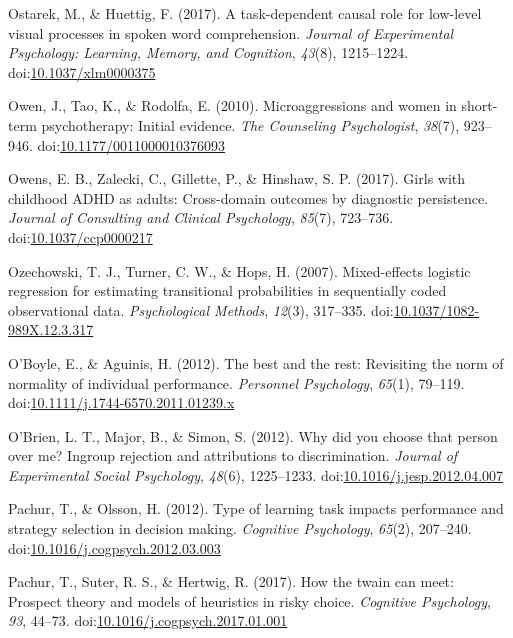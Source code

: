\documentclass[english,man]{apa6}
\theoremstyle{definition}
\theoremstyle{definition}
\theoremstyle{definition}
\theoremstyle{remark}
\begin{document}
\hypertarget{ref-Ostarek2017}{}
Ostarek, M., \& Huettig, F. (2017). A task-dependent causal role for
low-level visual processes in spoken word comprehension. \emph{Journal
of Experimental Psychology: Learning, Memory, and Cognition},
\emph{43}(8), 1215--1224.
doi:\href{https://doi.org/10.1037/xlm0000375}{10.1037/xlm0000375}

\hypertarget{ref-Owen2010}{}
Owen, J., Tao, K., \& Rodolfa, E. (2010). Microaggressions and women in
short-term psychotherapy: Initial evidence. \emph{The Counseling
Psychologist}, \emph{38}(7), 923--946.
doi:\href{https://doi.org/10.1177/0011000010376093}{10.1177/0011000010376093}

\hypertarget{ref-Owens2017a}{}
Owens, E. B., Zalecki, C., Gillette, P., \& Hinshaw, S. P. (2017). Girls
with childhood ADHD as adults: Cross-domain outcomes by diagnostic
persistence. \emph{Journal of Consulting and Clinical Psychology},
\emph{85}(7), 723--736.
doi:\href{https://doi.org/10.1037/ccp0000217}{10.1037/ccp0000217}

\hypertarget{ref-Ozechowski2007}{}
Ozechowski, T. J., Turner, C. W., \& Hops, H. (2007). Mixed-effects
logistic regression for estimating transitional probabilities in
sequentially coded observational data. \emph{Psychological Methods},
\emph{12}(3), 317--335.
doi:\href{https://doi.org/10.1037/1082-989X.12.3.317}{10.1037/1082-989X.12.3.317}

\hypertarget{ref-OBoyle2012}{}
O'Boyle, E., \& Aguinis, H. (2012). The best and the rest: Revisiting
the norm of normality of individual performance. \emph{Personnel
Psychology}, \emph{65}(1), 79--119.
doi:\href{https://doi.org/10.1111/j.1744-6570.2011.01239.x}{10.1111/j.1744-6570.2011.01239.x}

\hypertarget{ref-OBrien2012}{}
O'Brien, L. T., Major, B., \& Simon, S. (2012). Why did you choose that
person over me? Ingroup rejection and attributions to discrimination.
\emph{Journal of Experimental Social Psychology}, \emph{48}(6),
1225--1233.
doi:\href{https://doi.org/10.1016/j.jesp.2012.04.007}{10.1016/j.jesp.2012.04.007}

\hypertarget{ref-Pachur2012}{}
Pachur, T., \& Olsson, H. (2012). Type of learning task impacts
performance and strategy selection in decision making. \emph{Cognitive
Psychology}, \emph{65}(2), 207--240.
doi:\href{https://doi.org/10.1016/j.cogpsych.2012.03.003}{10.1016/j.cogpsych.2012.03.003}

\hypertarget{ref-Pachur2017}{}
Pachur, T., Suter, R. S., \& Hertwig, R. (2017). How the twain can meet:
Prospect theory and models of heuristics in risky choice.
\emph{Cognitive Psychology}, \emph{93}, 44--73.
doi:\href{https://doi.org/10.1016/j.cogpsych.2017.01.001}{10.1016/j.cogpsych.2017.01.001}
\end{document}
